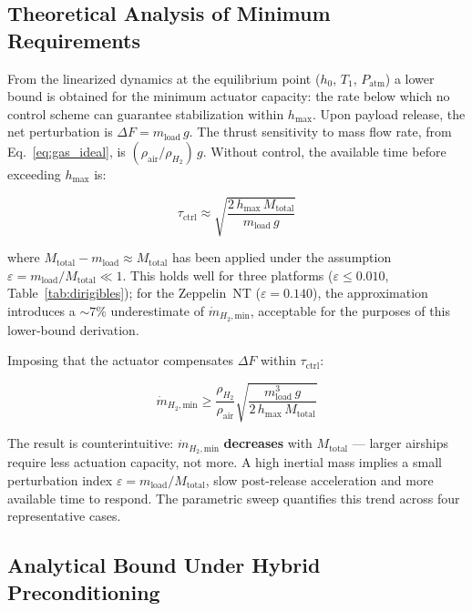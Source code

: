 \documentclass[applsci,article,submit,pdftex,moreauthors]{Definitions/mdpi}
\newcommand{\dotmmin}{\dot{m}_{H_2,\text{min}}}
\begin{document}
\subsection{Theoretical Analysis of Minimum Requirements}
\label{sec:theoretical}
From the linearized dynamics at the equilibrium point ($h_0$, $T_1$, $P_\text{atm}$) a lower bound is obtained for the minimum actuator capacity: the rate below which no control scheme can guarantee stabilization within $h_\text{max}$. Upon payload release, the net perturbation is $\Delta F = m_\text{load}\,g$. The thrust sensitivity to mass flow rate, from Eq.~\eqref{eq:gas_ideal}, is $(\rho_\text{air}/\rho_{H_2})\,g$. Without control, the available time before exceeding $h_\text{max}$ is:

\begin{equation}
\tau_\text{ctrl} \approx
\sqrt{\frac{2\,h_\text{max}\,M_\text{total}}{m_\text{load}\,g}}
\label{eq:tau}
\end{equation}

where $M_\text{total} - m_\text{load} \approx M_\text{total}$ has been applied under the
assumption $\varepsilon = m_\text{load}/M_\text{total} \ll 1$. This holds well for three
platforms ($\varepsilon \leq 0.010$, Table~\ref{tab:dirigibles}); for the Zeppelin~NT
($\varepsilon = 0.140$), the approximation introduces a ${\sim}7\%$ underestimate of
$\dotmmin$, acceptable for the purposes of this lower-bound derivation.

Imposing that the actuator compensates $\Delta F$ within $\tau_\text{ctrl}$:

\begin{equation}
\dotmmin \geq \frac{\rho_{H_2}}{\rho_\text{air}}
\sqrt{\frac{m_\text{load}^3\,g}{2\,h_\text{max}\,M_\text{total}}}
\label{eq:mmin_final}
\end{equation}

The result is counterintuitive: $\dotmmin$ \textbf{decreases} with $M_\text{total}$ — larger airships require less actuation capacity, not more. A high inertial mass implies a small perturbation index $\varepsilon = m_\text{load}/M_\text{total}$, slow post-release acceleration and more available time to respond. The parametric sweep quantifies this trend across four representative cases.

\subsection{Analytical Bound Under Hybrid Preconditioning}
\label{sec:hybrid_bound}
\end{document}
